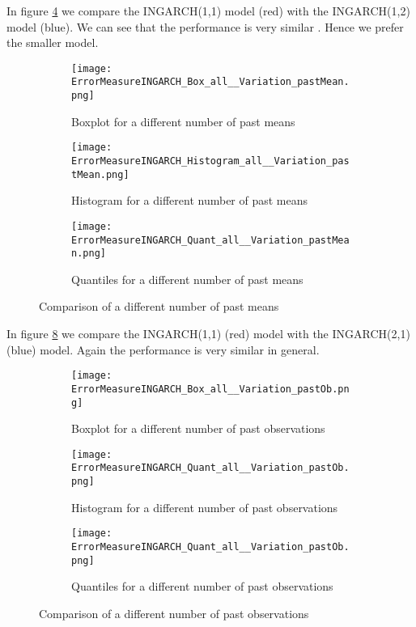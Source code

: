 In figure \ref{fig:past means Comp1} we compare the INGARCH(1,1) model (red) with the INGARCH(1,2) model (blue). We can see that the performance is very similar . Hence we prefer the smaller model. 
\begin{figure}[htb!]
\centering
\begin{subfigure}[b]{0.45\textwidth}
\texttt{[image: ErrorMeasureINGARCH\_Box\_all\_\_Variation\_pastMean.png]}
\caption{Boxplot for a different number of past means}
\label{fig:past means Box}
\end{subfigure}
\hfill
\begin{subfigure}[b]{0.45\textwidth}
\texttt{[image: ErrorMeasureINGARCH\_Histogram\_all\_\_Variation\_pastMean.png]}
\caption{Histogram for a different number of past means}
\label{fig:past means Hist}
\end{subfigure}
\hfill
\begin{subfigure}[b]{0.8\textwidth}
\texttt{[image: ErrorMeasureINGARCH\_Quant\_all\_\_Variation\_pastMean.png]}
\caption{Quantiles for a different number of past means}
\label{fig:past means Quant}
\end{subfigure}
\caption{Comparison of a different number of past means}
\label{fig:past means Comp1}
\end{figure}


In figure \ref{fig:past obs Comp1} we compare the INGARCH(1,1) (red) model with the INGARCH(2,1) (blue) model. Again the performance is very similar in general. 

\begin{figure}[htb!]
\centering
\begin{subfigure}[b]{0.45\textwidth}
\texttt{[image: ErrorMeasureINGARCH\_Box\_all\_\_Variation\_pastOb.png]}
\caption{Boxplot for a different number of past observations}
\label{fig:past obs Box}
\end{subfigure}
\hfill
\begin{subfigure}[b]{0.45\textwidth}
\texttt{[image: ErrorMeasureINGARCH\_Quant\_all\_\_Variation\_pastOb.png]}
\caption{Histogram for a different number of past observations}
\label{fig:past obs Hist}
\end{subfigure}
\hfill
\begin{subfigure}[b]{0.8\textwidth}
\texttt{[image: ErrorMeasureINGARCH\_Quant\_all\_\_Variation\_pastOb.png]}
\caption{Quantiles for a different number of past observations}
\label{fig:past obs Quant}
\end{subfigure}
\caption{Comparison of a different number of past observations}
\label{fig:past obs Comp1}
\end{figure}


